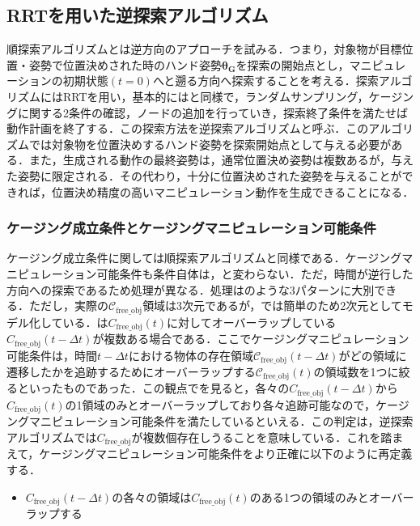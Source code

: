 \documentclass[a4paper,twoside,12pt,papersize, dvipdfmx]{iirthesis}
\begin{document}
\subsection{RRTを用いた逆探索アルゴリズム}
順探索アルゴリズムとは逆方向のアプローチを試みる．つまり，対象物が目標位置・姿勢で位置決めされた時のハンド姿勢$\bm{\theta_G}$を探索の開始点とし，マニピュレーションの初期状態$(t=0)$へと遡る方向へ探索することを考える．探索アルゴリズムにはRRTを用い，基本的にはと同様で，ランダムサンプリング，ケージングに関する2条件の確認，ノードの追加を行っていき，探索終了条件を満たせば動作計画を終了する．この探索方法を逆探索アルゴリズムと呼ぶ．このアルゴリズムでは対象物を位置決めするハンド姿勢を探索開始点として与える必要がある．また，生成される動作の最終姿勢は，通常位置決め姿勢は複数あるが，与えた姿勢に限定される．その代わり，十分に位置決めされた姿勢を与えることができれば，位置決め精度の高いマニピュレーション動作を生成できることになる．


\subsubsection{ケージング成立条件とケージングマニピュレーション可能条件}\label{subsec::planner::revcm}
ケージング成立条件に関しては順探索アルゴリズムと同様である．ケージングマニピュレーション可能条件も条件自体は，と変わらない．ただ，時間が逆行した方向への探索であるため処理が異なる．処理はのような3パターンに大別できる．ただし，実際の$\mathcal{C}_{\mathrm{free\_obj}}$領域は3次元であるが，では簡単のため2次元としてモデル化している．は$C_{\mathrm{free\_obj}}(t)$に対してオーバーラップしている$C_{\mathrm{free\_obj}}(t-\Delta t)$が複数ある場合である．ここでケージングマニピュレーション可能条件は，時間$t-\Delta t$における物体の存在領域$\mathcal{C}_{\mathrm{free\_obj}}(t-\Delta t)$がどの領域に遷移したかを追跡するためにオーバーラップする$\mathcal{C}_{\mathrm{free\_obj}}(t)$の領域数を1つに絞るといったものであった．この観点でを見ると，各々の$C_{\mathrm{free\_obj}}(t-\Delta t)$から$C_{\mathrm{free\_obj}}(t)$の1領域のみとオーバーラップしており各々追跡可能なので，ケージングマニピュレーション可能条件を満たしているといえる．この判定は，逆探索アルゴリズムでは$C_{\mathrm{free\_obj}}$が複数個存在しうることを意味している．これを踏まえて，ケージングマニピュレーション可能条件をより正確に以下のように再定義する．
\begin{itemize}
\item $C_{\mathrm{free\_obj}}(t-\Delta t)$の各々の領域は$C_{\mathrm{free\_obj}}(t)$のある1つの領域のみとオーバーラップする
\end{itemize}
\end{document}
